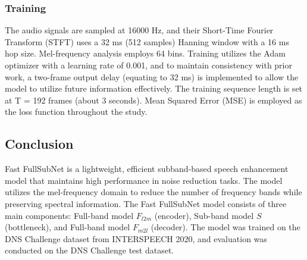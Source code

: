 \subsubsection{Training}
The audio signals are sampled at 16000 Hz, and their Short-Time Fourier Transform (STFT) uses a 32 ms (512 samples) Hanning window with a 16 ms hop size.
Mel-frequency analysis employs 64 bins. Training utilizes the Adam optimizer with a learning rate of 0.001, and to maintain consistency with prior work,
a two-frame output delay (equating to 32 ms) is implemented to allow the model to utilize future information effectively.
The training sequence length is set at T = 192 frames (about 3 seconds). Mean Squared Error (MSE) is employed as the loss function throughout the study.


\subsection{Conclusion}
Fast FullSubNet is a lightweight, efficient subband-based speech enhancement model that maintains high performance in noise reduction tasks.
The model utilizes the mel-frequency domain to reduce the number of frequency bands while preserving spectral information.
The Fast FullSubNet model consists of three main components: Full-band model $F_{l2m}$ (encoder), Sub-band model $S$ (bottleneck), and Full-band model $F_{m2l}$ (decoder).
The model was trained on the DNS Challenge dataset from INTERSPEECH 2020, and evaluation was conducted on the DNS Challenge test dataset.